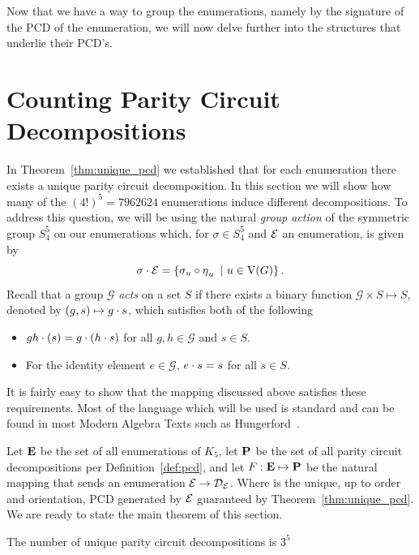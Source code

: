 Now that we have a way to group the enumerations, namely by the signature of the PCD of the enumeration, we will now delve further into the structures that underlie their PCD's. 

\section{Counting Parity Circuit Decompositions}

In Theorem~\ref{thm:unique_pcd} we established that for each enumeration there exists a unique parity circuit decomposition. In this section we will show how many of the $(4!)^5 = 7962624$ enumerations induce different decompositions. To address this question, we will be using the natural {\em group action} of the symmetric group $S_{4}^5$ on our enumerations which, for $\sigma \in S_{4}^5$ and $\operatorname{\mathcal{E}}$ an enumeration,  is given by \[\sigma \cdot \operatorname{\mathcal{E}} = \left\{ \sigma_{u} \circ \operatorname{\eta}_u\ \vert\ u\in \mathrm{V}(G) \right\}.\] Recall that a group $\mathcal{G}$ {\em acts} on a set $S$ if there exists a binary function $\mathcal{G} \times S \mapsto S$,  denoted by $\left(g,s\right) \mapsto g \cdot s$, which satisfies both of the following 
\begin{itemize}
\item $gh \cdot \left(s\right)= g \cdot \left(h \cdot s\right)$ for all $g,h \in \mathcal{G}$ and $s \in S$.
\item For the identity element $e \in \mathcal{G}$, $e \cdot s = s$ for all $s \in S$.  
\end{itemize}
\noindent
It is fairly easy to show that the mapping discussed above satisfies these requirements. Most of the language which will be used is standard and can be found in most Modern Algebra Texts such as Hungerford~\cite{Hungerford:1974zr}.

Let $\operatorname{\mathbf{E}}$ be the set of all enumerations of $K_5$, let $\operatorname{\mathbf{P}}$ be the set of all parity circuit decompositions per Definition~\ref{def:pcd}, and let $F:\operatorname{\mathbf{E}} \mapsto \operatorname{\mathbf{P}} $ be the natural mapping that sends an enumeration $\operatorname{\mathcal{E}} \rightarrow \operatorname{\mathcal{D}}_{\operatorname{\mathcal{E}}}$. Where is the unique, up to order and orientation, PCD generated by $\operatorname{\mathcal{E}}$ guaranteed by Theorem~\ref{thm:unique_pcd}. We are ready to state the main theorem of this section. 

\begin{theorem}
  \label{thm:pcd_count}
The number of unique parity circuit decompositions is $3^5$
\end{theorem}
 
